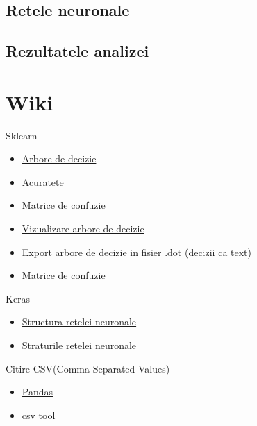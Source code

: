 \documentclass[runningheads,a4paper,11pt]{report}
\begin{document}
\section{Retele neuronale}
\label{analizaReteleVarsta}

\section{Rezultatele analizei}
\label{analizaRezultate}

\chapter{Wiki}
\label{chapter:wiki}

Sklearn
\begin{itemize}
    \item \href{https://scikit-learn.org/stable/modules/generated/sklearn.tree.DecisionTreeClassifier.html}{Arbore de decizie}
    \item \href{https://scikit-learn.org/stable/modules/generated/sklearn.metrics.accuracy_score.html}{Acuratete}
    \item \href{https://scikit-learn.org/stable/modules/generated/sklearn.metrics.confusion_matrix.html}{Matrice de confuzie}
    \item \href{https://scikit-learn.org/stable/modules/generated/sklearn.tree.export_graphviz.html}{Vizualizare arbore de decizie}
    \item \href{https://scikit-learn.org/stable/modules/generated/sklearn.tree.export_text.html}{Export arbore de decizie in fisier .dot (decizii ca text)}
    \item \href{https://scikit-learn.org/stable/modules/generated/sklearn.metrics.ConfusionMatrixDisplay.html#sklearn.metrics.ConfusionMatrixDisplay.from_predictions}{Matrice de confuzie}
\end{itemize}

\noindent Keras
\begin{itemize}
    \item \href{https://keras.io/api/models/sequential/}{Structura retelei neuronale}
    \item \href{https://keras.io/api/layers/}{Straturile retelei neuronale}
\end{itemize}

\noindent Citire CSV(Comma Separated Values)
\begin{itemize}
    \item \href{https://pandas.pydata.org/pandas-docs/stable/reference/api/pandas.read_csv.html}{Pandas}
    \item \href{https://docs.python.org/3/library/csv.html}{csv tool}
\end{itemize}
\end{document}
